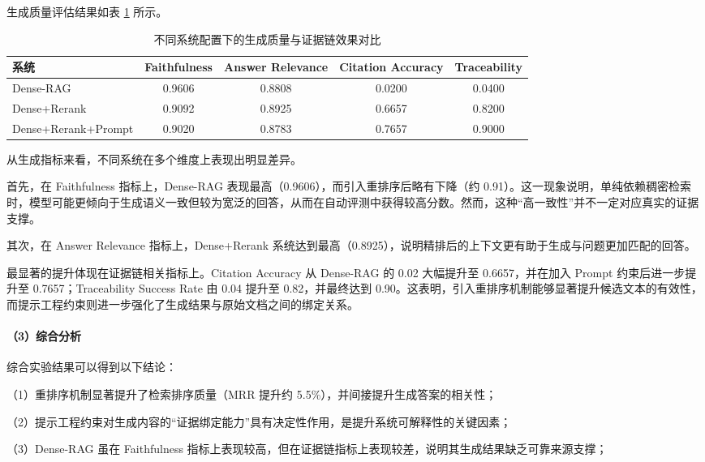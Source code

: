 \documentclass[UTF8,a4paper,zihao=-4]{ctexart}
\begin{document}
生成质量评估结果如表 \ref{tab:generation_result} 所示。

\begin{table}[H]
\centering
\caption{不同系统配置下的生成质量与证据链效果对比}
\label{tab:generation_result}
{\small
\renewcommand{\arraystretch}{1.2}
\begin{adjustbox}{max width=\textwidth}
\begin{tabular}{lcccc}
\toprule
系统 & Faithfulness & Answer Relevance & Citation Accuracy & Traceability \\
\midrule
Dense-RAG & 0.9606 & 0.8808 & 0.0200 & 0.0400 \\
Dense+Rerank & 0.9092 & 0.8925 & 0.6657 & 0.8200 \\
Dense+Rerank+Prompt & 0.9020 & 0.8783 & 0.7657 & 0.9000 \\
\bottomrule
\end{tabular}
\end{adjustbox}
}
\end{table}

从生成指标来看，不同系统在多个维度上表现出明显差异。

首先，在 Faithfulness 指标上，Dense-RAG 表现最高（0.9606），而引入重排序后略有下降（约 0.91）。这一现象说明，单纯依赖稠密检索时，模型可能更倾向于生成语义一致但较为宽泛的回答，从而在自动评测中获得较高分数。然而，这种“高一致性”并不一定对应真实的证据支撑。

其次，在 Answer Relevance 指标上，Dense+Rerank 系统达到最高（0.8925），说明精排后的上下文更有助于生成与问题更加匹配的回答。

最显著的提升体现在证据链相关指标上。Citation Accuracy 从 Dense-RAG 的 0.02 大幅提升至 0.6657，并在加入 Prompt 约束后进一步提升至 0.7657；Traceability Success Rate 由 0.04 提升至 0.82，并最终达到 0.90。这表明，引入重排序机制能够显著提升候选文本的有效性，而提示工程约束则进一步强化了生成结果与原始文档之间的绑定关系。

\paragraph{（3）综合分析}

综合实验结果可以得到以下结论：

（1）重排序机制显著提升了检索排序质量（MRR 提升约 5.5\%），并间接提升生成答案的相关性；

（2）提示工程约束对生成内容的“证据绑定能力”具有决定性作用，是提升系统可解释性的关键因素；

（3）Dense-RAG 虽在 Faithfulness 指标上表现较高，但在证据链指标上表现较差，说明其生成结果缺乏可靠来源支撑；
\end{document}
